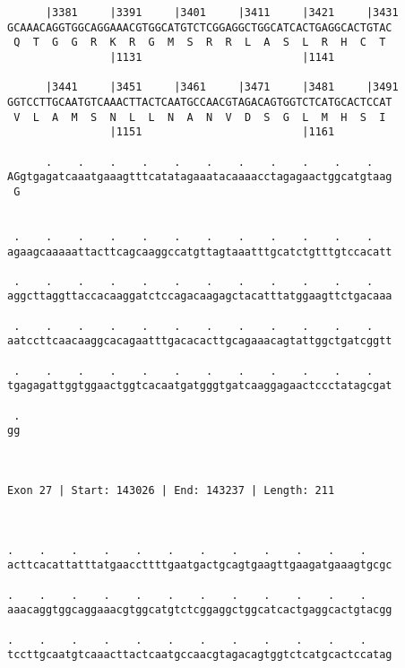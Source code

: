 \documentclass{article}
\begin{document}
\begin{Verbatim}
      |3381     |3391     |3401     |3411     |3421     |3431
GCAAACAGGTGGCAGGAAACGTGGCATGTCTCGGAGGCTGGCATCACTGAGGCACTGTAC
 Q  T  G  G  R  K  R  G  M  S  R  R  L  A  S  L  R  H  C  T 
                |1131                         |1141         
  
      |3441     |3451     |3461     |3471     |3481     |3491
GGTCCTTGCAATGTCAAACTTACTCAATGCCAACGTAGACAGTGGTCTCATGCACTCCAT
 V  L  A  M  S  N  L  L  N  A  N  V  D  S  G  L  M  H  S  I 
                |1151                         |1161         
  
      .    .    .    .    .    .    .    .    .    .    .   
AGgtgagatcaaatgaaagtttcatatagaaatacaaaacctagagaactggcatgtaag
 G                                                          
                                                            
  
 .    .    .    .    .    .    .    .    .    .    .    .   
agaagcaaaaattacttcagcaaggccatgttagtaaatttgcatctgtttgtccacatt
                                                            
 .    .    .    .    .    .    .    .    .    .    .    .   
aggcttaggttaccacaaggatctccagacaagagctacatttatggaagttctgacaaa
                                                            
 .    .    .    .    .    .    .    .    .    .    .    .   
aatccttcaacaaggcacagaatttgacacacttgcagaaacagtattggctgatcggtt
                                                            
 .    .    .    .    .    .    .    .    .    .    .    .   
tgagagattggtggaactggtcacaatgatgggtgatcaaggagaactccctatagcgat
                                                            
 .
gg
  
  
 
Exon 27 | Start: 143026 | End: 143237 | Length: 211



.    .    .    .    .    .    .    .    .    .    .    .    
acttcacattatttatgaaccttttgaatgactgcagtgaagttgaagatgaaagtgcgc
                                                            
.    .    .    .    .    .    .    .    .    .    .    .    
aaacaggtggcaggaaacgtggcatgtctcggaggctggcatcactgaggcactgtacgg
                                                            
.    .    .    .    .    .    .    .    .    .    .    .    
tccttgcaatgtcaaacttactcaatgccaacgtagacagtggtctcatgcactccatag
                                                            

\end{Verbatim}
\end{document}
